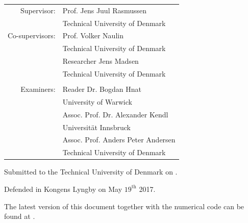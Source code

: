 \begin{titlepage}
\begin{center}
        \large
        {\def\arraystretch{1}\tabcolsep=10pt
        \begin{tabular}{rl}
        Supervisor:     & Prof. Jens Juul Rasmussen          \\ & Technical University of Denmark\\
        Co-supervisors: & Prof. Volker Naulin                \\ & Technical University of Denmark\\
                        & Researcher Jens Madsen             \\ & Technical University of Denmark\\
        &\\
        Examiners:      & Reader Dr.  Bogdan Hnat            \\ & University of Warwick\\
                        & Assoc. Prof. Dr.  Alexander Kendl  \\ & Universit{\"a}t Innsbruck\\
                        & Assoc. Prof. Anders Peter Andersen \\ & Technical University of Denmark\\
        \end{tabular}
        }

        \vfill

        Submitted to the Technical University of Denmark on \thesisDate.

        Defended in Kongens Lyngby on May $19^{\text{th}}$ 2017.

        \vfill
        The latest version of this document together with the numerical code can be found at \celmaProject.
    \end{center}
\end{titlepage}

